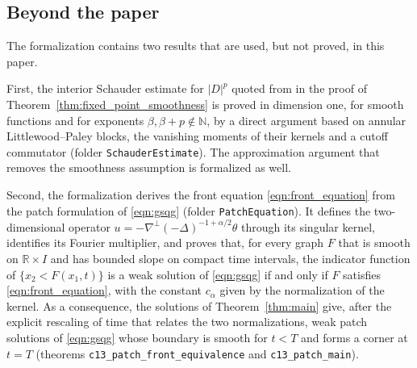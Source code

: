 \documentclass[11pt]{amsart}
\newcommand{\lean}{\lstinline[style=lean]}
\theoremstyle{definition}
\theoremstyle{remark}
\numberwithin{equation}{section}
\begin{document}
\subsection{Beyond the paper}\label{app:lean-extensions}

The formalization contains two results that are used, but not proved, in this paper.

First, the interior Schauder estimate for $|D|^p$ quoted from \cite{RosOton-Serra:dirichlet-fractional-laplacian} in the proof of Theorem~\ref{thm:fixed_point_smoothness} is proved in dimension one, for smooth functions and for exponents $\beta,\beta+p\notin\mathbb N$, by a direct argument based on annular Littlewood--Paley blocks, the vanishing moments of their kernels and a cutoff commutator (folder \lean{SchauderEstimate}). The approximation argument that removes the smoothness assumption is formalized as well.

Second, the formalization derives the front equation \eqref{eqn:front_equation} from the patch formulation of \eqref{eqn:gsqg} (folder \lean{PatchEquation}). It defines the two-dimensional operator $u=-\nabla^\perp(-\Delta)^{-1+\alpha/2}\theta$ through its singular kernel, identifies its Fourier multiplier, and proves that, for every graph $F$ that is smooth on $\mathbb R\times I$ and has bounded slope on compact time intervals, the indicator function of $\{x_2<F(x_1,t)\}$ is a weak solution of \eqref{eqn:gsqg} if and only if $F$ satisfies \eqref{eqn:front_equation}, with the constant $c_\alpha$ given by the normalization of the kernel. As a consequence, the solutions of Theorem~\ref{thm:main} give, after the explicit rescaling of time that relates the two normalizations, weak patch solutions of \eqref{eqn:gsqg} whose boundary is smooth for $t<T$ and forms a corner at $t=T$ (theorems \lean{c13_patch_front_equivalence} and \lean{c13_patch_main}).




\end{document}
